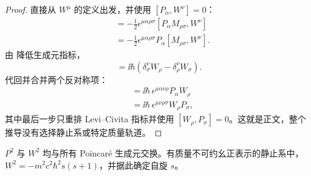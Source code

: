 \begin{proof}
直接从 $W^\mu$ 的定义出发，并使用 $[P_\alpha,W^\nu]=0$：
\begin{align*}
[W^\mu,W^\nu]
&=-\frac12\epsilon^{\mu\alpha\rho\sigma}
[P_\alpha M_{\rho\sigma},W^\nu]\\
&=-\frac12\epsilon^{\mu\alpha\rho\sigma}
P_\alpha[M_{\rho\sigma},W^\nu].
\end{align*}
由 降低生成元指标，
\begin{equation*}
[M_{\rho\sigma},W^\nu]
=\ii\hbar(\delta_\sigma^\nu W_\rho-\delta_\rho^\nu W_\sigma).
\end{equation*}
代回并合并两个反对称项：
\begin{align*}
[W^\mu,W^\nu]
&=\ii\hbar\,\epsilon^{\mu\alpha\nu\rho}P_\alpha W_\rho\\
&=\ii\hbar\,\epsilon^{\mu\nu\rho\sigma}W_\rho P_\sigma,
\end{align*}
其中最后一步只重排 Levi--Civita 指标并使用 $[W_\rho,P_\sigma]=0$。这就是正文，整个推导没有选择静止系或特定质量轨道。
\end{proof}

\begin{theorem}
$P^2$ 与 $W^2$ 均与所有 Poincaré 生成元交换。有质量不可约幺正表示的静止系中，$W^2=-m^2c^2\hbar^2s(s+1)$，并据此确定自旋 $s$。
\end{theorem}

